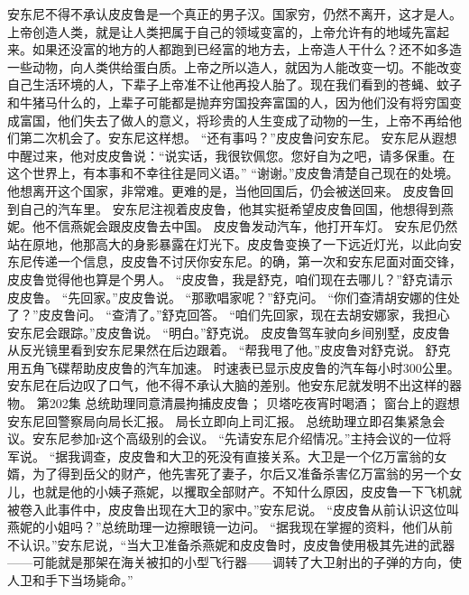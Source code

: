 \documentclass[a4paper,12pt,UTF8,twoside]{ctexbook}
\begin{document}
        安东尼不得不承认皮皮鲁是一个真正的男子汉。国家穷，仍然不离开，这才是人。上帝创造人类，就是让人类把属于自己的领域变富的，上帝允许有的地域先富起来。如果还没富的地方的人都跑到已经富的地方去，上帝造人干什么？还不如多造一些动物，向人类供给蛋白质。上帝之所以造人，就因为人能改变一切。不能改变自己生活环境的人，下辈子上帝准不让他再投人胎了。现在我们看到的苍蝇、蚊子和牛猪马什么的，上辈子可能都是抛弃穷国投奔富国的人，因为他们没有将穷国变成富国，他们失去了做人的意义，将珍贵的人生变成了动物的一生，上帝不再给他们第二次机会了。安东尼这样想。  
        “还有事吗？”皮皮鲁问安东尼。  
        安东尼从遐想中醒过来，他对皮皮鲁说：“说实话，我很钦佩您。您好自为之吧，请多保重。在这个世界上，有本事和不幸往往是同义语。”  
        “谢谢。”皮皮鲁清楚自己现在的处境。他想离开这个国家，非常难。更难的是，当他回国后，仍会被送回来。  
        皮皮鲁回到自己的汽车里。  
        安东尼注视着皮皮鲁，他其实挺希望皮皮鲁回国，他想得到燕妮。他不信燕妮会跟皮皮鲁去中国。  
      皮皮鲁发动汽车，他打开车灯。        
        安东尼仍然站在原地，他那高大的身影暴露在灯光下。皮皮鲁变换了一下远近灯光，以此向安东尼传递一个信息，皮皮鲁不讨厌你安东尼。的确，第一次和安东尼面对面交锋，皮皮鲁觉得他也算是个男人。  
        “皮皮鲁，我是舒克，咱们现在去哪儿？”舒克请示皮皮鲁。  
      “先回家。”皮皮鲁说。  
      “那歌唱家呢？”舒克问。  
      “你们查清胡安娜的住处了？”皮皮鲁问。  
      “查清了。”舒克回答。  
      “咱们先回家，现在去胡安娜家，我担心安东尼会跟踪。”皮皮鲁说。  
        “明白。”舒克说。  
        皮皮鲁驾车驶向乡间别墅，皮皮鲁从反光镜里看到安东尼果然在后边跟着。  
        “帮我甩了他。”皮皮鲁对舒克说。  
        舒克用五角飞碟帮助皮皮鲁的汽车加速。  
        时速表已显示皮皮鲁的汽车每小时300公里。  
        安东尼在后边叹了口气，他不得不承认大脑的差别。他安东尼就发明不出这样的器物。          第202集  
        总统助理同意清晨拘捕皮皮鲁；  
        贝塔吃夜宵时喝酒；  
        窗台上的遐想    
        安东尼回警察局向局长汇报。  
        局长立即向上司汇报。  
        总统助理立即召集紧急会议。安东尼参加r这个高级别的会议。  
        “先请安东尼介绍情况。”主持会议的一位将军说。  
        “据我调查，皮皮鲁和大卫的死没有直接关系。大卫是一个亿万富翁的女婿，为了得到岳父的财产，他先害死了妻子，尔后又准备杀害亿万富翁的另一个女儿，也就是他的小姨子燕妮，以攫取全部财产。不知什么原因，皮皮鲁一下飞机就被卷入此事件中，皮皮鲁出现在大卫的家中。”安东尼说。        
        “皮皮鲁从前认识这位叫燕妮的小姐吗？”总统助理一边擦眼镜一边问。  
        “据我现在掌握的资料，他们从前不认识。”安东尼说，“当大卫准备杀燕妮和皮皮鲁时，皮皮鲁使用极其先进的武器——可能就是那架在海关被扣的小型飞行器——调转了大卫射出的子弹的方向，使人卫和手下当场毙命。”  
\end{document}
